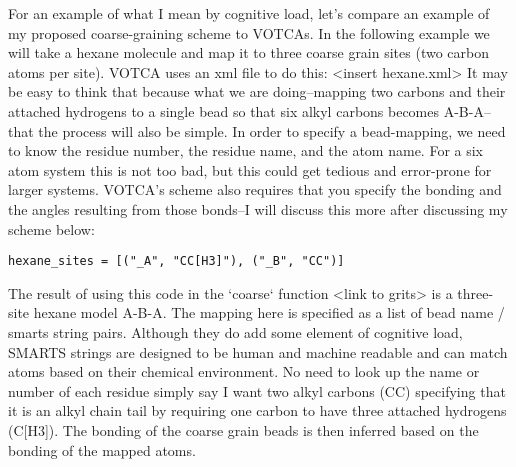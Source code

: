 For an example of what I mean by cognitive load, let's compare an example of my proposed coarse-graining scheme to VOTCAs. In the following example we will take a hexane molecule and map it to three coarse grain sites (two carbon atoms per site). VOTCA uses an xml file to do this:
<insert hexane.xml>
It may be easy to think that because what we are doing--mapping two carbons and their attached hydrogens to a single bead so that six alkyl carbons becomes A-B-A--that the process will also be simple. In order to specify a bead-mapping, we need to know the residue number, the residue name, and the atom name. For a six atom system this is not too bad, but this could get tedious and error-prone for larger systems. VOTCA's scheme also requires that you specify the bonding and the angles resulting from those bonds--I will discuss this more after discussing my scheme below:
\begin{lstlisting}
hexane_sites = [("_A", "CC[H3]"), ("_B", "CC")]
\end{lstlisting}
The result of using this code in the `coarse` function <link to grits> is a three-site hexane model A-B-A. The mapping here is specified as a list of bead name / smarts string pairs. Although they do add some element of cognitive load, SMARTS strings are designed to be human and machine readable and can match atoms based on their chemical environment. No need to look up the name or number of each residue simply say I want two alkyl carbons (CC) specifying that it is an alkyl chain tail by requiring one carbon to have three attached hydrogens (C[H3]). The bonding of the coarse grain beads is then inferred based on the bonding of the mapped atoms.


